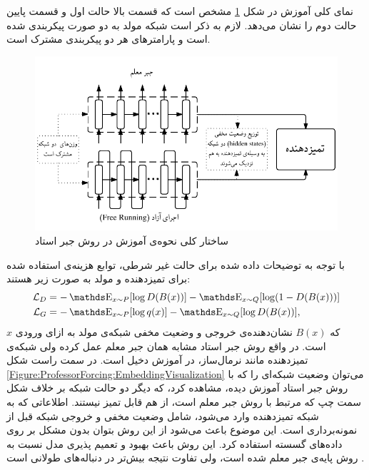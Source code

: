  نمای کلی آموزش در شکل
 \ref{Figure:ProfessorForcing:Architecture}
 مشخص است که قسمت بالا حالت اول و قسمت پایین حالت دوم را نشان می‌دهد. لازم به ذکر است شبکه مولد به دو صورت پیکربندی شده است و پارامترهای هر دو پیکربندی مشترک است.
\begin{figure}[!htb]
	\centering
	\includegraphics[width=1\textwidth]{images/ArchitectureProfessorForcing.pdf} 
 	\caption[ساختار کلی نحوه‌ی آموزش در روش جبر استاد]
 	{ساختار کلی نحوه‌ی آموزش در روش جبر استاد
 		\cite{lamb2016professor}}
	\label{Figure:ProfessorForcing:Architecture}
\end{figure}
با توجه به توضیحات داده شده برای حالت غیر شرطی، توابع هزینه‌ی استفاده شده برای تمیزدهنده و مولد به صورت زیر هستند:
\begin{equation}
\begin{split}
\mathcal{L}_D &= - \ME_{x \sim P} [\log D(B(x))] - \ME_{x \sim Q} [\log (1-D(B(x)))] \\
\mathcal{L}_G &= -\ME_{x \sim P} [\log q(x)] - \ME_{x \sim Q} [\log D(B(x))],
\end{split}
\end{equation}
که $B(x)$ نشان‌دهنده‌ی خروجی و وضعیت مخفی شبکه‌ی مولد به ازای ورودی $x$ است.
\newline
 در واقع روش جبر استاد مشابه همان جبر معلم عمل کرده ولی شبکه‌ی تمیزدهنده مانند نرمال‌ساز، در آموزش دخیل است.
 در سمت راست شکل
 \ref{Figure:ProfessorForcing:EmbeddingVisualization}
 می‌توان وضعیت شبکه‌ای را که با روش جبر استاد آموزش دیده، مشاهده کرد، که دیگر دو حالت شبکه بر خلاف شکل سمت چپ که مرتبط با روش جبر معلم است، از هم قابل تمیز نیستند.
 اطلاعاتی که به شبکه تمیزدهنده وارد می‌شود، شامل وضعیت مخفی و خروجی شبکه قبل از نمونه‌برداری است. این موضوع باعث می‌شود از این روش بتوان بدون مشکل بر روی داده‌های گسسته استفاده کرد.
 این روش باعث بهبود و تعمیم پذیری مدل نسبت به روش پایه‌ی جبر معلم شده است، ولی تفاوت نتیجه بیش‌تر در دنباله‌های طولانی است
  		\cite{lamb2016professor}.
